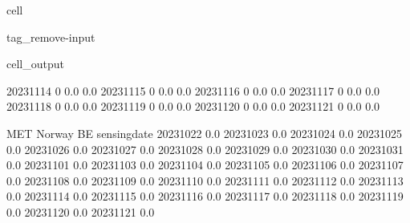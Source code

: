 \documentclass[letterpaper,10pt,english]{jupyterBook}
\begin{document}
\begin{sphinxuseclass}{cell}
\begin{sphinxuseclass}{tag_remove-input}
\begin{sphinxVerbatimOutput}
\begin{sphinxuseclass}{cell_output}
\begin{sphinxVerbatim}[commandchars=\\\{\}]
2023\PYGZhy{}11\PYGZhy{}14                0                    0.0                    0.0   
2023\PYGZhy{}11\PYGZhy{}15                0                    0.0                    0.0   
2023\PYGZhy{}11\PYGZhy{}16                0                    0.0                    0.0   
2023\PYGZhy{}11\PYGZhy{}17                0                    0.0                    0.0   
2023\PYGZhy{}11\PYGZhy{}18                0                    0.0                    0.0   
2023\PYGZhy{}11\PYGZhy{}19                0                    0.0                    0.0   
2023\PYGZhy{}11\PYGZhy{}20                0                    0.0                    0.0   
2023\PYGZhy{}11\PYGZhy{}21                0                    0.0                    0.0   

              MET Norway BE  
sensing\PYGZus{}date                 
2023\PYGZhy{}10\PYGZhy{}22              0.0  
2023\PYGZhy{}10\PYGZhy{}23              0.0  
2023\PYGZhy{}10\PYGZhy{}24              0.0  
2023\PYGZhy{}10\PYGZhy{}25              0.0  
2023\PYGZhy{}10\PYGZhy{}26              0.0  
2023\PYGZhy{}10\PYGZhy{}27              0.0  
2023\PYGZhy{}10\PYGZhy{}28              0.0  
2023\PYGZhy{}10\PYGZhy{}29              0.0  
2023\PYGZhy{}10\PYGZhy{}30              0.0  
2023\PYGZhy{}10\PYGZhy{}31              0.0  
2023\PYGZhy{}11\PYGZhy{}01              0.0  
2023\PYGZhy{}11\PYGZhy{}03              0.0  
2023\PYGZhy{}11\PYGZhy{}04              0.0  
2023\PYGZhy{}11\PYGZhy{}05              0.0  
2023\PYGZhy{}11\PYGZhy{}06              0.0  
2023\PYGZhy{}11\PYGZhy{}07              0.0  
2023\PYGZhy{}11\PYGZhy{}08              0.0  
2023\PYGZhy{}11\PYGZhy{}09              0.0  
2023\PYGZhy{}11\PYGZhy{}10              0.0  
2023\PYGZhy{}11\PYGZhy{}11              0.0  
2023\PYGZhy{}11\PYGZhy{}12              0.0  
2023\PYGZhy{}11\PYGZhy{}13              0.0  
2023\PYGZhy{}11\PYGZhy{}14              0.0  
2023\PYGZhy{}11\PYGZhy{}15              0.0  
2023\PYGZhy{}11\PYGZhy{}16              0.0  
2023\PYGZhy{}11\PYGZhy{}17              0.0  
2023\PYGZhy{}11\PYGZhy{}18              0.0  
2023\PYGZhy{}11\PYGZhy{}19              0.0  
2023\PYGZhy{}11\PYGZhy{}20              0.0  
2023\PYGZhy{}11\PYGZhy{}21              0.0  
\end{sphinxVerbatim}

\end{sphinxuseclass}\end{sphinxVerbatimOutput}

\end{sphinxuseclass}
\end{sphinxuseclass}
\end{document}
